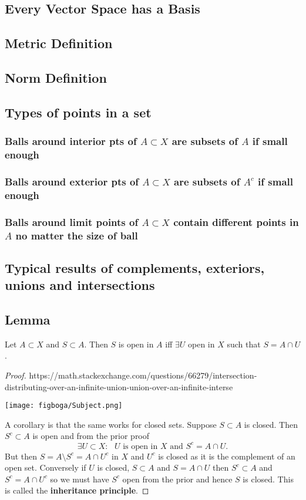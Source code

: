 \documentclass{article}
\begin{document}
\subsection*{Every Vector Space has a Basis}
\subsection*{Metric Definition}
\subsection*{Norm Definition}
\subsection*{Types of points in a set}
\subsubsection*{Balls around interior pts of $A \subset X$ are subsets of $A$ if small enough}
\subsubsection*{Balls around exterior pts of $A \subset X$ are subsets of $A^c$ if small enough}
\subsubsection*{Balls around limit points of $A \subset X$ contain different points in $A$ no matter the size of ball}
\subsection*{Typical results of complements, exteriors, unions and intersections}
\subsection*{Lemma}
Let $A \subset X$ and $S \subset A$. Then $S$ is open in $A$ iff $\exists U$ open in $X$ such that $S = A \cap U$.
\begin{proof}
https://math.stackexchange.com/questions/66279/intersection-distributing-over-an-infinite-union-union-over-an-infinite-interse
\begin{center}
\texttt{[image: figboga/Subject.png]}
\end{center}
A corollary is that the same works for closed sets. Suppose $S \subset A$ is closed. Then $S^c \subset A$ is open and
from the prior proof
$$\exists U \subset X: \text{ $U$ is open in $X$ and } S^c = A \cap U.$$
But then $S = A \setminus S^c = A \cap U^c$ in $X$ and $U^c$ is closed as it is the complement of an open set. Conversely
if $U$ is closed, $S \subset A$ and $S = A \cap U$ then $S^c \subset A$ and $S^c = A \cap U^c$ so we must have $S^c$ open from the prior and hence $S$ is closed. This is called the
\textbf{inheritance principle}.
\end{proof}
\end{document}
